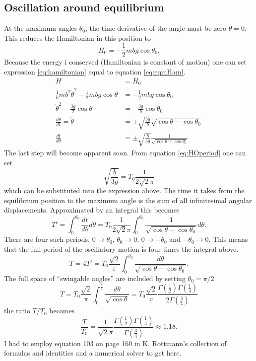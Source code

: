 \documentclass[11pt]{amsart}
\begin{document}
\subsection{Oscillation around equilibrium}
At the maximum angles $\theta_0$, the time derivative of the angle must be zero $\dot{\theta} = 0$. This reduces the Hamiltonian in this position to 
\begin{equation}
\label{eq:eqmHam}
H_0 = -\frac{1}{2}mbg \cos\theta_0.
\end{equation}
Because the energy i conserved (Hamiltonian is constant of motion) one can set expression \ref{eq:hamiltonian} equal to equation \ref{eq:eqmHam}.
\begin{align*}
H &= H_0 \\
\frac{1}{6}mb^2\dot{\theta}^2 - \frac{1}{2}mbg\cos\theta &= -\frac{1}{2}mbg\cos\theta_0 \\
\dot{\theta}^2 - \frac{3g}{2}\cos\theta &= - \frac{3g}{b}\cos\theta_0 \\
\frac{d\theta}{dt} = \dot{\theta} &= \pm \sqrt{\frac{3g}{b}}\sqrt{\cos\theta - \cos\theta_0} \\
\frac{dt}{d\theta} &= \pm \sqrt{\frac{b}{3g}} \frac{1}{\sqrt{\cos\theta - \cos\theta_0}}
\end{align*}
The last step will become apparent soon. From equation \ref{eq:HOperiod} one can set
\begin{equation}
\label{eq:H0period2}
\sqrt{\frac{b}{3g}} = T_0 \frac{1}{2\sqrt{2}\pi}
\end{equation}
which can be substituted into the expression above. The time it takes from the equilibrium position to the maximum angle is the sum of all infinitesimal angular displacements. Approximated by an integral this becomes
\begin{equation*}
T' = \int_0^{\theta_0}\frac{dt}{d\theta} d\theta = T_0 \frac{1}{2\sqrt{2}\pi}\int_0^{\theta_0}\frac{1}{\sqrt{\cos\theta - \cos\theta_0}}d\theta.
\end{equation*}
There are four such periods, $0 \to \theta_0$, $\theta_0 \to 0$, $0 \to -\theta_0$ and $-\theta_0 \to 0$. This means that the full period of the oscillatory motion is four times the integral above.
\begin{equation*}
T = 4T' = T_0 \frac{\sqrt{2}}{\pi} \int_0^{\theta_0}\frac{d\theta}{\sqrt{\cos\theta - \cos\theta_0}}.
\end{equation*}
The full space of ``swingable angles'' are included by setting $\theta_0 = \pi/2$
\begin{equation}
T = T_0\frac{\sqrt{2}}{\pi}\int_0^{\frac{\pi}{2}}\frac{d\theta}{\sqrt{\cos\theta}} = T_0\frac{\sqrt{2}}{\pi} \frac{\Gamma\left(\frac{1}{2} \right)\Gamma\left(\frac{1}{4} \right)}{2\Gamma\left(\frac{3}{4} \right)}
\end{equation}
the ratio $T/T_0$ becomes
\begin{equation}
\frac{T}{T_0} = \frac{1}{\sqrt{2}\pi}\frac{\Gamma\left(\frac{1}{2} \right)\Gamma\left(\frac{1}{4} \right)}{\Gamma\left(\frac{3}{4} \right)} \approx 1.18.
\end{equation}
I had to employ equation 103 on page 160 in K. Rottmann's collection of formulas and identities and a numerical solver to get here.
\end{document}
